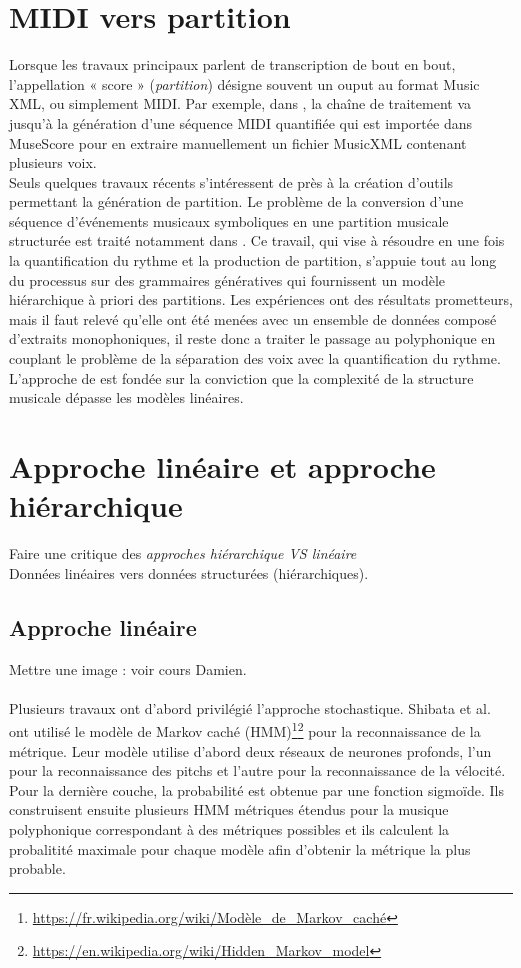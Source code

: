 \section{MIDI vers partition}
Lorsque les travaux principaux parlent de transcription de bout en bout, l’appellation « score » (\textit{partition}) désigne souvent un ouput au format Music XML, ou simplement MIDI. Par exemple, dans \cite{SHIBATA2021262}, la chaîne de traitement va jusqu’à la génération d’une séquence MIDI quantifiée qui est importée dans MuseScore pour en extraire manuellement un fichier MusicXML contenant plusieurs voix.\\
Seuls quelques travaux récents s’intéressent de près à la création d’outils permettant la génération de partition. Le problème de la conversion d'une séquence d'événements musicaux symboliques en une partition musicale structurée est traité notamment dans \cite{foscarin:hal-01988990}. Ce travail, qui vise à résoudre en une fois la quantification du rythme et la production de partition, s’appuie tout au long du processus sur  des grammaires génératives qui fournissent un modèle hiérarchique à priori des partitions. Les expériences ont des résultats prometteurs, mais il faut relevé qu’elle ont été menées avec un ensemble de données composé d'extraits monophoniques, il reste donc a traiter le passage au polyphonique en couplant le problème de la séparation des voix avec la quantification du rythme.\\
L'approche de \cite{foscarin:hal-01988990} est fondée sur la conviction que la complexité de la structure musicale dépasse les modèles linéaires.
\section{Approche linéaire et approche hiérarchique}
Faire une critique des \textit{approches hiérarchique VS linéaire}\\
Données linéaires vers données structurées (hiérarchiques).
\subsection*{Approche linéaire}
Mettre une image : voir cours Damien.\\\\
Plusieurs travaux ont d’abord privilégié l’approche stochastique. Shibata et al.\cite{SHIBATA2021262} ont utilisé le modèle de Markov caché (HMM)\footnote{\url{https://fr.wikipedia.org/wiki/Modèle_de_Markov_caché}}\footnote{\url{https://en.wikipedia.org/wiki/Hidden_Markov_model}} pour la reconnaissance de la métrique. Leur modèle utilise d’abord deux réseaux de neurones profonds, l’un pour la reconnaissance des pitchs et l’autre pour la reconnaissance de la vélocité. Pour la dernière couche, la probabilité est obtenue par une fonction sigmoïde. Ils construisent ensuite plusieurs HMM métriques étendus pour la musique polyphonique correspondant à des métriques possibles et ils calculent la probalitité maximale pour chaque modèle afin d’obtenir la métrique la plus probable.\\

